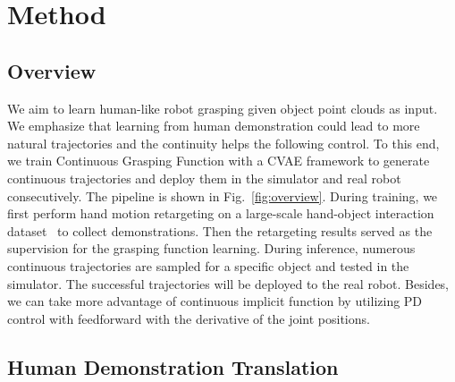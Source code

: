 \documentclass[letterpaper, 10 pt, journal, twoside]{IEEEtran}
\begin{document}
\section{Method}
\label{sec:method}

\vspace{-0.05in}
\subsection{Overview}

We aim to learn human-like robot grasping given object point clouds as input. We emphasize that learning from human demonstration could lead to more natural trajectories and the continuity helps the following control. To this end, we train Continuous Grasping Function with a CVAE framework to generate continuous trajectories and deploy them in the simulator and real robot consecutively. The pipeline is shown in Fig.~\ref{fig:overview}. During training, we first perform hand motion retargeting on a large-scale hand-object interaction dataset~\cite{chao2021dexycb} to collect demonstrations. Then the retargeting results served as the supervision for the grasping function learning. During inference, numerous continuous trajectories are sampled for a specific object and tested in the simulator. The successful trajectories will be deployed to the real robot. Besides, we can take more advantage of continuous implicit function by utilizing PD control with feedforward with the derivative of the joint positions.

\vspace{-0.05in}
\subsection{Human Demonstration Translation}
\label{subsec:retargeting}
\end{document}

